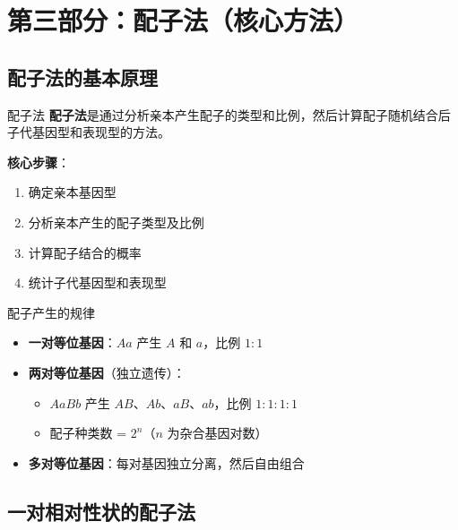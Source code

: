 \documentclass[a4paper,11pt]{ctexart}
\begin{document}

\section{第三部分：配子法（核心方法）}

\subsection{配子法的基本原理}

\begin{definitionbox}{配子法}
\textbf{配子法}是通过分析亲本产生配子的类型和比例，然后计算配子随机结合后子代基因型和表现型的方法。

\textbf{核心步骤}：
\begin{enumerate}[leftmargin=2em]
    \item 确定亲本基因型
    \item 分析亲本产生的配子类型及比例
    \item 计算配子结合的概率
    \item 统计子代基因型和表现型
\end{enumerate}
\end{definitionbox}

\begin{lemmabox}{配子产生的规律}
\begin{itemize}[leftmargin=2em]
    \item \textbf{一对等位基因}：$Aa$ 产生 $A$ 和 $a$，比例 $1:1$
    \item \textbf{两对等位基因}（独立遗传）：
        \begin{itemize}
            \item $AaBb$ 产生 $AB$、$Ab$、$aB$、$ab$，比例 $1:1:1:1$
            \item 配子种类数 = $2^n$（$n$ 为杂合基因对数）
        \end{itemize}
    \item \textbf{多对等位基因}：每对基因独立分离，然后自由组合
\end{itemize}
\end{lemmabox}

\subsection{一对相对性状的配子法}
\end{document}
